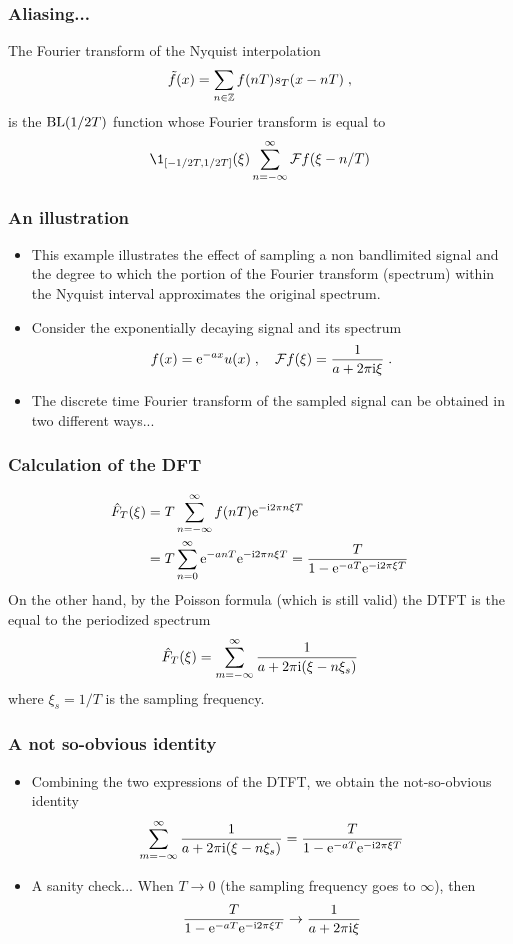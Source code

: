 \begin{frame}
\frametitle{Aliasing...}
The Fourier transform of the Nyquist interpolation
\begin{equation*}
\tilde{f}(x) = \sum_{n \in \mathbb{Z}} f(nT) s_T(x-nT)  \;,
\end{equation*}
is the $\mathrm{BL}(1/2T)$ function whose Fourier transform is equal to
\[
\1_{[-1/2T,1/2T]}(\xi) \sum_{n=-\infty}^{\infty} \TF f(\xi - n/T)
\]
\end{frame}

\begin{frame}
\frametitle{An illustration}
\begin{itemize}
\item This example illustrates the effect of sampling a non bandlimited signal and the degree to which the portion of the Fourier transform (\alert{spectrum}) within the Nyquist interval approximates the original spectrum.
\item Consider the exponentially decaying signal and its spectrum
\[
f(x) = \mathrm{e}^{-a x} u(x) \;, \quad \mathcal{F} f(\xi)= \frac{1}{a + 2 \pi \mathrm{i} \xi} \;.
\]
\item The discrete time Fourier transform of the sampled signal can be obtained in two different ways...
\end{itemize}
\end{frame}


\begin{frame}
\frametitle{Calculation of the DFT}
\begin{align*}
\hat{F}_T(\xi)
&= T \sum_{n=-\infty}^{\infty} f(nT) \mathrm{e}^{- \mathrm{i} 2 \pi n \xi T}  \\
&= T \sum_{n=0}^\infty \mathrm{e}^{-a n T} \mathrm{e}^{- \mathrm{i} 2 \pi n \xi T} = \frac{T}{1-\mathrm{e}^{-aT} \mathrm{e}^{-\mathrm{i} 2 \pi \xi T}}
\end{align*}
On the other hand, by the Poisson formula (which is still valid) the DTFT is the equal to the periodized spectrum
\[
\hat{F}_T(\xi) = \sum_{m=-\infty}^{\infty} \frac{1}{a + 2 \pi \mathrm{i} (\xi - n \xi_s)}
\]
where $\xi_s= 1/T$ is the \alert{sampling frequency}.

\end{frame}

\begin{frame}
\frametitle{A not so-obvious identity}
\begin{itemize}
\item Combining the two expressions of the DTFT, we obtain the not-so-obvious identity
\[
\sum_{m=-\infty}^{\infty} \frac{1}{a + 2 \pi \mathrm{i} (\xi - n \xi_s)} = \frac{T}{1-\mathrm{e}^{-aT} \mathrm{e}^{-\mathrm{i} 2 \pi \xi T}}
\]
\item  \alert{A sanity check}... When $T \to 0$ (the sampling frequency goes to $\infty$), then
\[
\frac{T}{1-\mathrm{e}^{-aT} \mathrm{e}^{-\mathrm{i} 2 \pi \xi T}} \to \frac{1}{a + 2 \pi \mathrm{i} \xi}
\]
\end{itemize}
\end{frame}

